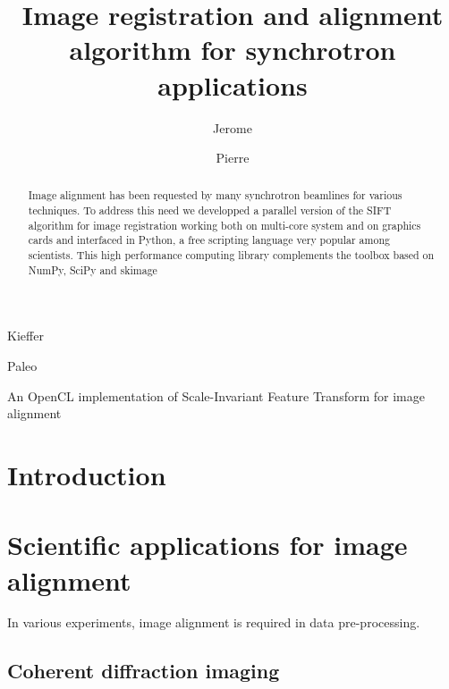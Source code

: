\documentclass[preprint]{iucr}
\begin{document}
\title{Image registration and alignment algorithm for synchrotron applications}

    \author[a]{Jerome}{Kieffer}
    \author[b]{Pierre}{Paleo}

\maketitle

\begin{synopsis}
An OpenCL implementation of Scale-Invariant Feature Transform for image alignment
\end{synopsis}

\begin{abstract}
Image alignment has been requested by many synchrotron beamlines for
various techniques.
To address this need we developped a parallel version of the SIFT algorithm
for image registration working both on multi-core system and on graphics cards
and interfaced in Python, a free scripting language very popular among
scientists. This high performance computing library complements the toolbox
based on NumPy\cite{numpy}, SciPy\cite{scipy} and skimage\cite{skimage} 

 
\end{abstract}

\section{Introduction}

\section{Scientific applications for image alignment}
In various experiments, image alignment is required in data pre-processing.
\subsection{Coherent diffraction imaging}
\end{document}
